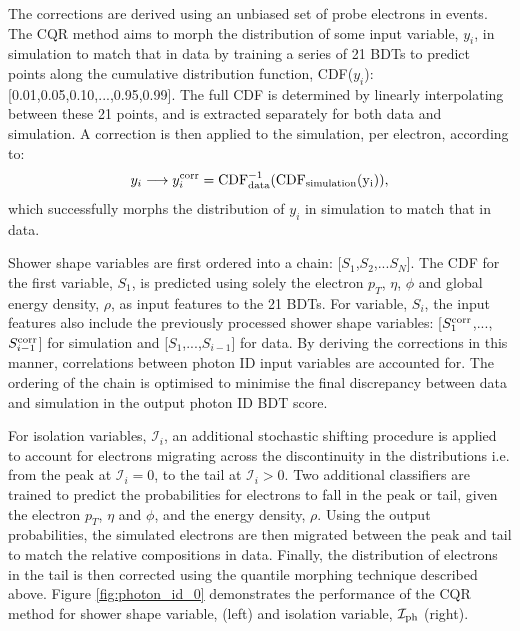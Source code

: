 The corrections are derived using an unbiased set of probe electrons in \Zee events. The CQR method aims to morph the distribution of some input variable, $y_i$, in simulation to match that in data by training a series of 21 BDTs to predict points along the cumulative distribution function, CDF($y_i$): [0.01,0.05,0.10,...,0.95,0.99]. The full CDF is determined by linearly interpolating between these 21 points, and is extracted separately for both data and simulation. A correction is then applied to the simulation, per electron, according to:
\begin{equation}
    y_i \longrightarrow y_i^{\rm{corr}} = \rm{CDF}^{-1}_{\rm{data}}(\rm{CDF}_{\rm{simulation}}(y_i)),
\end{equation}
\noindent 
which successfully morphs the distribution of $y_i$ in simulation to match that in data. 

Shower shape variables are first ordered into a chain: [$S_1$,$S_2$,...$S_N$]. The CDF for the first variable, $S_1$, is predicted using solely the electron $p_T$, $\eta$, $\phi$ and global energy density, $\rho$, as input features to the 21 BDTs. For variable, $S_i$, the input features also include the previously processed shower shape variables: [$S^{\rm{corr}}_1$,...,$S^{\rm{corr}}_{i-1}$] for simulation and [$S_1$,...,$S_{i-1}$] for data. By deriving the corrections in this manner, correlations between photon ID input variables are accounted for. The ordering of the chain is optimised to minimise the final discrepancy between data and simulation in the output photon ID BDT score.

For isolation variables, $\mathcal{I}_i$, an additional stochastic shifting procedure is applied to account for electrons migrating across the discontinuity in the distributions i.e. from the peak at $\mathcal{I}_i=0$, to the tail at $\mathcal{I}_i>0$. Two additional classifiers are trained to predict the probabilities for electrons to fall in the peak or tail, given the electron $p_T$, $\eta$ and $\phi$, and the energy density, $\rho$. Using the output probabilities, the simulated electrons are then migrated between the peak and tail to match the relative compositions in data. Finally, the distribution of electrons in the tail is then corrected using the quantile morphing technique described above. Figure \ref{fig:photon_id_0} demonstrates the performance of the CQR method for shower shape variable, \RNINE (left) and isolation variable, $\mathcal{I}_{\rm{ph}}$ (right).

